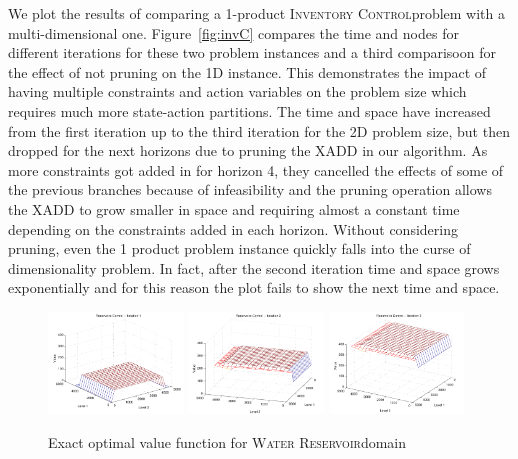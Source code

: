 \documentclass[letterpaper]{article}
\newcommand{\InventoryControl}{\textsc{Inventory Control}}
\newcommand{\WaterReservoir}{\textsc{Water Reservoir}}
\begin{document}
We plot the results of comparing a 1-product \InventoryControl problem with
a multi-dimensional one. Figure~\ref{fig:invC} compares the time and nodes
for different iterations for these two problem instances and a third
comparisoon for the effect of not pruning on the 1D instance. This
demonstrates the impact of having multiple constraints and action variables
on the problem size which requires much more state-action partitions. The
time and space have increased from the first iteration up to the third
iteration for the 2D problem size, but then dropped for the next horizons
due to pruning the XADD in our algorithm. As more constraints got added in
for horizon 4, they cancelled the effects of some of the previous branches
because of infeasibility and the pruning operation allows the XADD to grow
smaller in space and requiring almost a constant time depending on the
constraints added in each horizon. Without considering pruning, even the 1
product problem instance quickly falls into the curse of dimensionality
problem. In fact, after the second iteration time and space grows
exponentially and for this reason the plot fails to show the next time and
space.
 
\begin{figure}[t!]
\centering
\includegraphics[width=0.32\textwidth]{Figures1/ref1.pdf}
\includegraphics[width=0.32\textwidth]{Figures1/ref3.pdf}
\includegraphics[width=0.32\textwidth]{Figures1/ref6.pdf}
\caption{\footnotesize
Exact optimal value function for \WaterReservoir domain
}
\label{fig:reservoir}
\end{figure}
 
\end{document}

